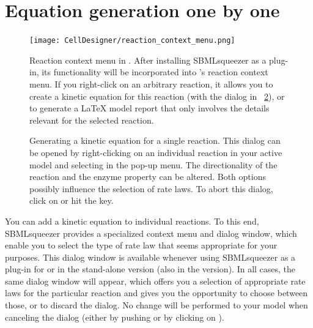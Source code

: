 \section{Equation generation one by one}
\label{sec:EquationsOneByOne}
\begin{figure}
\texttt{[image: CellDesigner/reaction\_context\_menu.png]}
\caption[Reaction context menu in \CellDesigner]{Reaction context menu in \CellDesigner.
After installing SBMLsqueezer as a plug-in, its functionality will be incorporated into \CellDesigner's reaction context menu.
If you right-click on an arbitrary reaction, it allows you to create a kinetic equation for this reaction (with the  dialog in ~\ref{fig:RateLawDialog}), or to generate a \LaTeX{} model report that only involves the details relevant for the selected reaction.}
\label{fig:ReactionContextMenu}
\end{figure}
\begin{figure}[b!]
\caption[Generating a kinetic equation for a single reaction]{Generating a kinetic equation for a single reaction.
This dialog can be opened by right-clicking on an individual reaction in your active model and selecting  in the pop-up menu.
The directionality of the reaction and the enzyme property can be altered.
Both options possibly influence the selection of rate laws.
To abort this dialog, click on  or hit the \keys{\escwin} key.}
\label{fig:RateLawDialog}
\end{figure}

You can add a kinetic equation to individual reactions.
To this end, SBMLsqueezer provides a specialized context menu and dialog window, which enable you to select the type of rate law that seems appropriate for your purposes.
This dialog window is available whenever using SBMLsqueezer as a plug-in for \CellDesigner or in the stand-alone version (also in the \Garuda version).
In all cases, the same dialog window will appear, which offers you a selection of appropriate rate laws for the particular reaction and gives you the opportunity to choose between those, or to discard the dialog.
No change will be performed to your model when canceling the dialog (either by pushing \keys{\escwin} or by clicking on ).

